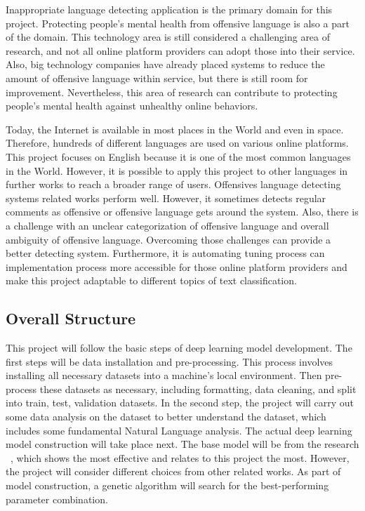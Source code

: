 \documentclass[11pt, natbib=false]{article}
\begin{document}
\begin{multicols}{2}
Inappropriate language detecting application is the primary domain for this project.
Protecting people’s mental health from offensive language is also a part of the domain.
This technology area is still considered a challenging area of research, and not all online platform providers can adopt those into their service.
Also, big technology companies have already placed systems to reduce the amount of offensive language within service, but there is still room for improvement.
Nevertheless, this area of research can contribute to protecting people’s mental health against unhealthy online behaviors. 

Today, the Internet is available in most places in the World and even in space.
Therefore, hundreds of different languages are used on various online platforms.
This project focuses on English because it is one of the most common languages in the World.
However, it is possible to apply this project to other languages in further works to reach a broader range of users.
Offensives language detecting systems related works perform well.
However, it sometimes detects regular comments as offensive or offensive language gets around the system.
Also, there is a challenge with an unclear categorization of offensive language and overall ambiguity of offensive language.
Overcoming those challenges can provide a better detecting system.
Furthermore, it is automating tuning process can implementation process more accessible for those online platform providers and make this project adaptable to different topics of text classification. 

\subsection{Overall Structure}
This project will follow the basic steps of deep learning model development.
The first steps will be data installation and pre-processing.
This process involves installing all necessary datasets into a machine’s local environment.
Then pre-process these datasets as necessary, including formatting, data cleaning, and split into train, test, validation datasets.
In the second step, the project will carry out some data analysis on the dataset to better understand the dataset, which includes some fundamental Natural Language analysis.
The actual deep learning model construction will take place next.
The base model will be from the research ~\cite{hada2021ruddit}, which shows the most effective and relates to this project the most.
However, the project will consider different choices from other related works.
As part of model construction, a genetic algorithm will search for the best-performing parameter combination. 


\end{multicols}
\end{document}
